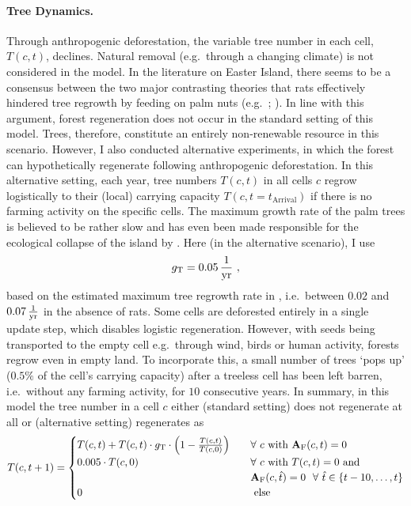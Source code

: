 \paragraph{Tree Dynamics.}
Through anthropogenic deforestation, the variable tree number in each cell, $T(c,t)$, declines.
Natural removal (e.g.\ through a changing climate) is not considered in the model.
In the literature on Easter Island, there seems to be a consensus between the two major contrasting theories that rats effectively hindered tree regrowth by feeding on palm nuts (e.g.\ ; ).
In line with this argument, forest regeneration does not occur in the standard setting of this model.
Trees, therefore, constitute an entirely non-renewable resource in this scenario. 
However, I also conducted alternative experiments, in which the forest can hypothetically regenerate following anthropogenic deforestation.
In this alternative setting, each year, tree numbers $T(c,t)$ in all cells $c$ regrow logistically to their (local) carrying capacity $T(c,t=t_\text{Arrival})$ if there is no farming activity on the specific cells.
The maximum growth rate of the palm trees is believed to be rather slow and has even been made responsible for the ecological collapse of the island by \citet{Brander1998}.
Here (in the alternative scenario), I use
\begin{equation}
g_{\rm T} = 0.05\, {\rm \frac{1}{yr}} \ ,
\end{equation}
based on the estimated maximum tree regrowth rate in \citet{Brandt2015}, i.e.\ between $0.02$ and $0.07\, {\rm \frac{1}{yr}}$ in the absence of rats.
Some cells are deforested entirely in a single update step, which disables logistic regeneration. 
However, with seeds being transported to the empty cell e.g.\ through wind, birds or human activity, forests regrow even in empty land.
To incorporate this, a small number of trees `pops up' ($0.5\%$ of the cell's carrying capacity) after a treeless cell has been left barren, i.e.\ without any farming activity, for $10$ consecutive years.
In summary, in this model the tree number in a cell $c$ either (standard setting) does not regenerate at all or (alternative setting) regenerates as
\begin{equation}\label{eq:treeupdate}
T(c,t+1)= \begin{cases}
T(c,t) + T(c,t) \cdot g_{\rm T} \cdot \left(1- \frac{T(c,t)}{T(c,0)}\right) \quad & \forall \ c \text{ with } \mathbf{A}_{\rm F}(c,t)=0 \\
0.005 \cdot T(c,0)  & \forall  \ c \text{ with } T(c,t)=0 \text{ and}\\
& \mathbf{A}_{\rm F}(c,\hat{t})=0 \  \ \forall \  \hat{t} \in \{t-10, \ldots, t\} \\
0 & \text{ else }
\end{cases}
\end{equation}
